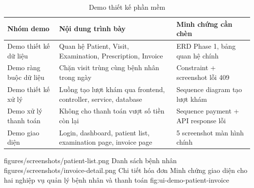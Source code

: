 \begin{longtable}{|p{3.2cm}|p{5.5cm}|p{5.5cm}|}
\caption{Demo thiết kế phần mềm}\\
\hline
\textbf{Nhóm demo} & \textbf{Nội dung trình bày} & \textbf{Minh chứng cần chèn} \\
\hline
Demo thiết kế dữ liệu & Quan hệ Patient, Visit, Examination, Prescription, Invoice & ERD Phase 1, bảng quan hệ chính \\
\hline
Demo ràng buộc dữ liệu & Chặn visit trùng cùng bệnh nhân trong ngày & Constraint + screenshot lỗi 409 \\
\hline
Demo thiết kế xử lý & Luồng tạo lượt khám qua frontend, controller, service, database & Sequence diagram tạo lượt khám \\
\hline
Demo xử lý thanh toán & Không cho thanh toán vượt số tiền còn lại & Sequence payment + API response lỗi \\
\hline
Demo giao diện & Login, dashboard, patient list, examination page, invoice page & 5 screenshot màn hình chính \\
\hline
\end{longtable}

\TwoDemoFigures
{figures/screenshots/patient-list.png}
{Danh sách bệnh nhân}
{figures/screenshots/invoice-detail.png}
{Chi tiết hóa đơn}
{Minh chứng giao diện cho hai nghiệp vụ quản lý bệnh nhân và thanh toán}
{fig:ui-demo-patient-invoice}
